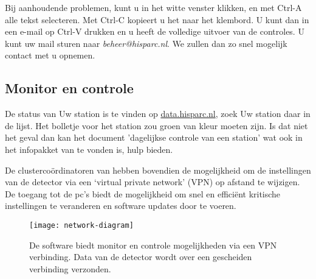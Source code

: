 Bij aanhoudende problemen, kunt u in het witte venster klikken, en met
Ctrl-A alle tekst selecteren. Met Ctrl-C kopieert u het naar het
klembord. U kunt dan in een e-mail op Ctrl-V drukken en u heeft de
volledige uitvoer van de controles. U kunt uw mail sturen naar
\emph{beheer@hisparc.nl}. We zullen dan zo snel mogelijk contact met u opnemen.

\subsection{Monitor en controle}

De status van Uw station is te vinden op \url{data.hisparc.nl}, zoek Uw
station daar in de lijst. Het bolletje voor het station zou groen van
kleur moeten zijn. Is dat niet het geval dan kan het document
'dagelijkse controle van een station' wat ook in het infopakket van
\hisparc te vonden is, hulp bieden.


De clustercoördinatoren van \hisparc hebben bovendien de mogelijkheid om de
instellingen van de detector via een ‘virtual private network’ (VPN) op afstand 
te wijzigen. De toegang tot de pc’s biedt de mogelijkheid om snel en 
efficiënt kritische instellingen te veranderen en software updates door te voeren.

\begin{figure}
    \centering
    \texttt{[image: network-diagram]}
    \caption{De software biedt monitor en controle mogelijkheden via een VPN verbinding. Data van de detector wordt over een gescheiden verbinding verzonden.}
    \label{fig:network-diagram}
\end{figure}


